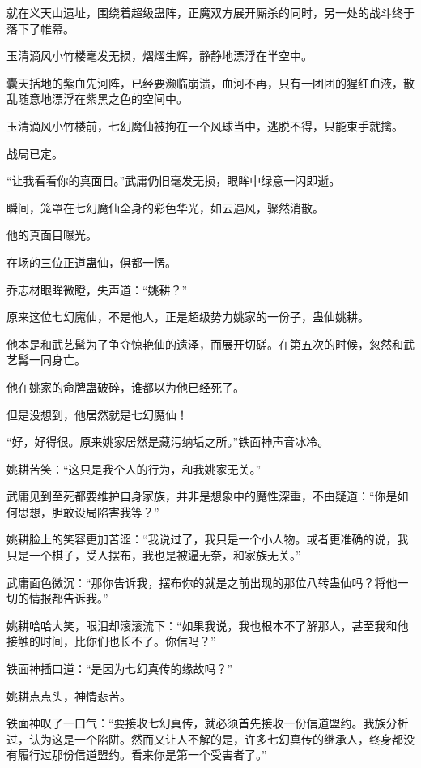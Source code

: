 
\begin{this_body}

就在义天山遗址，围绕着超级蛊阵，正魔双方展开厮杀的同时，另一处的战斗终于落下了帷幕。

玉清滴风小竹楼毫发无损，熠熠生辉，静静地漂浮在半空中。

囊天括地的紫血先河阵，已经要濒临崩溃，血河不再，只有一团团的猩红血液，散乱随意地漂浮在紫黑之色的空间中。

玉清滴风小竹楼前，七幻魔仙被拘在一个风球当中，逃脱不得，只能束手就擒。

战局已定。

“让我看看你的真面目。”武庸仍旧毫发无损，眼眸中绿意一闪即逝。

瞬间，笼罩在七幻魔仙全身的彩色华光，如云遇风，骤然消散。

他的真面目曝光。

在场的三位正道蛊仙，俱都一愣。

乔志材眼眸微瞪，失声道：“姚耕？”

原来这位七幻魔仙，不是他人，正是超级势力姚家的一份子，蛊仙姚耕。

他本是和武艺髯为了争夺惊艳仙的遗泽，而展开切磋。在第五次的时候，忽然和武艺髯一同身亡。

他在姚家的命牌蛊破碎，谁都以为他已经死了。

但是没想到，他居然就是七幻魔仙！

“好，好得很。原来姚家居然是藏污纳垢之所。”铁面神声音冰冷。

姚耕苦笑：“这只是我个人的行为，和我姚家无关。”

武庸见到至死都要维护自身家族，并非是想象中的魔性深重，不由疑道：“你是如何思想，胆敢设局陷害我等？”

姚耕脸上的笑容更加苦涩：“我说过了，我只是一个小人物。或者更准确的说，我只是一个棋子，受人摆布，我也是被逼无奈，和家族无关。”

武庸面色微沉：“那你告诉我，摆布你的就是之前出现的那位八转蛊仙吗？将他一切的情报都告诉我。”

姚耕哈哈大笑，眼泪却滚滚流下：“如果我说，我也根本不了解那人，甚至我和他接触的时间，比你们也长不了。你信吗？”

铁面神插口道：“是因为七幻真传的缘故吗？”

姚耕点点头，神情悲苦。

铁面神叹了一口气：“要接收七幻真传，就必须首先接收一份信道盟约。我族分析过，认为这是一个陷阱。然而又让人不解的是，许多七幻真传的继承人，终身都没有履行过那份信道盟约。看来你是第一个受害者了。”


\end{this_body}
